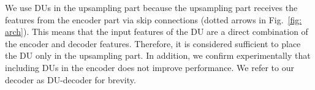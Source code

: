 \documentclass[a4paper,fleqn]{cas-dc}
\begin{document}
We use DUs in the upsampling part because the upsampling part receives the features from the encoder part via skip connections (dotted arrows in Fig.~\ref{fig: arch}). This means that the input features of the DU are a direct combination of the encoder and decoder features. Therefore, it is considered sufficient to place the DU only in the upsampling part. In addition, we confirm experimentally that including DUs in the encoder does not improve performance.
We refer to our decoder as DU-decoder for brevity. 


\begin{comment}
In this study, we focus on the point cloud segmentation task. To this end, we construct DU-Net, a dedicated network that improves the segmentation by learning to enhance/suppress edges. The overview of the architecture is shown in Fig.~\ref{fig: arch} (top). As can be seen, the network consists of two major components: an encoder and the DU-decoder. 

The encoder is responsible for hierarchical feature abstraction. In each encoder stage, input point features are transformed by certain functions and subsequently downsampled. The downsampling ensures an efficient encoding of multi-resolution characteristics, leading to a more discriminative feature representation. After downsampling, point features are passed to the next stage. 
We select KPConv~\cite{thomas2019kpconv} as the encoder for its excellent performance. Note that we use the depthwise~\cite{sifre2014rigid} version of KPConv except in the first stage to reduce the overall complexity. The comparison of different encoders is presented in Section~\ref{sec: design}. For downsampling, we adopt the farthest point sampling~\cite{qi2017pointnet++}, a widely adopted downsampling method in point cloud analysis.    

We design DU-decoder to improve segmentation by learning to enhance/suppress edges. As illustrated in Fig.~\ref{fig: arch} (top right), the DU-decoder is an alternate application of upsampling and DU. The DU-decoder reverses the process of the encoder by performing upsampling stage by stage. An upsampling layer receives the output of the previous layer and recovers the resolution which matches the resolution of points in the adjacent upper stage of the encoder. To assist usampling of features, we adopt U-Net--style skip connection~\cite{ronneberger2015u}. The upsampled feature is subsequently processed by DU. Through adaptively enhancing/suppressing edges, DU refines the features such that the resulting representation is more accurate and faithful to the ground truth. A DU is applied to each stage so that the features of different resolutions remain discriminative throughout the forward propagation.           
\end{comment}
\end{document}
